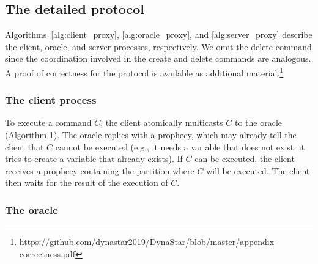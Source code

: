 \subsection{The detailed protocol}
\label{sec:detailed}

Algorithms~\ref{alg:client_proxy}, \ref{alg:oracle_proxy}, and \ref{alg:server_proxy} describe the client, oracle, and server processes, respectively. 
We omit the delete command since the coordination involved in the create and delete commands are analogous. 
A proof of correctness for the protocol is available as additional material.\footnote{https://github.com/dynastar2019/DynaStar/blob/master/appendix-correctness.pdf}


\subsubsection{The client process} 

To execute a command $C$, the client atomically multicasts $C$ to the oracle (Algorithm 1).
The oracle replies with a prophecy, which may already tell the client that $C$ cannot be executed (e.g., it needs a variable that does not exist, it tries to create a variable that already exists).
If $C$ can be executed, the client receives a prophecy containing the partition where $C$ will be executed. The client then waits for the result of the execution of $C$.




\subsubsection{The oracle} 

